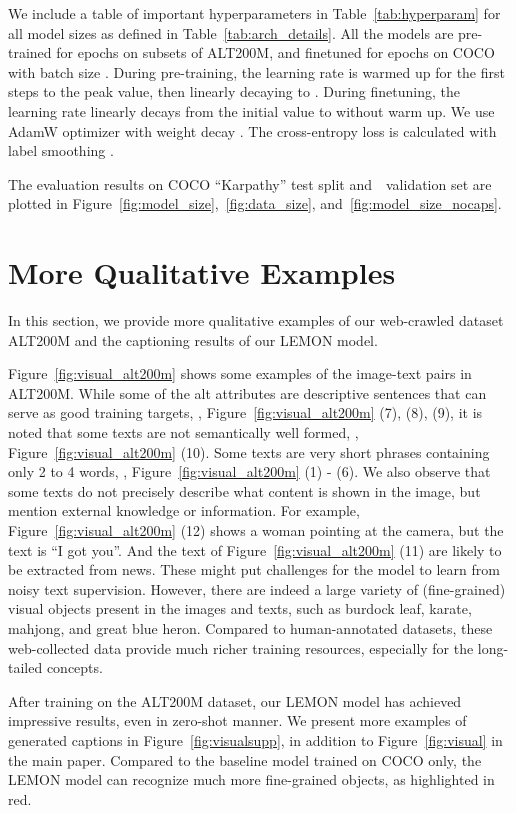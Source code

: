 We include a table of important hyperparameters in Table~\ref{tab:hyperparam} for all model sizes as defined in Table~\ref{tab:arch_details}. All the models are pre-trained for  epochs on subsets of ALT200M, and finetuned for  epochs on COCO with batch size . During pre-training, the learning rate is warmed up for the first  steps to the peak value, then linearly decaying to . During finetuning, the learning rate linearly decays from the initial value to  without warm up. We use AdamW optimizer with weight decay . The cross-entropy loss is calculated with label smoothing .

The evaluation results on COCO ``Karpathy'' test split and~\nocaps~validation set are plotted in Figure~\ref{fig:model_size},~\ref{fig:data_size}, and~\ref{fig:model_size_nocaps}.

\section{More Qualitative Examples}


In this section, we provide more qualitative examples of our web-crawled dataset ALT200M and the captioning results of our LEMON model.

Figure~\ref{fig:visual_alt200m} shows some examples of the image-text pairs in ALT200M. While some of the alt attributes are descriptive sentences that can serve as good training targets, \eg, Figure~\ref{fig:visual_alt200m} (7), (8), (9), it is noted that some texts are not semantically well formed, \eg, Figure~\ref{fig:visual_alt200m} (10). Some texts are very short phrases containing only 2 to 4 words, \eg, Figure~\ref{fig:visual_alt200m} (1) - (6). We also observe that some texts do not precisely describe what content is shown in the image, but mention external knowledge or information. For example, Figure~\ref{fig:visual_alt200m} (12) shows a woman pointing at the camera, but the text is ``I got you''. And the text of  Figure~\ref{fig:visual_alt200m} (11) are likely to be extracted from news. These might put challenges for the model to learn from noisy text supervision. However, there are indeed a large variety of (fine-grained) visual objects present in the images and texts, such as burdock leaf, karate, mahjong, and great blue heron. Compared to human-annotated datasets, these web-collected data provide much richer training resources, especially for the long-tailed concepts. 

After training on the ALT200M dataset, our LEMON model has achieved impressive results, even in zero-shot manner. We present more examples of generated captions in Figure~\ref{fig:visualsupp}, in addition to Figure~\ref{fig:visual} in the main paper. Compared to the baseline model trained on COCO only, the LEMON model can recognize much more fine-grained objects, as highlighted in red.


